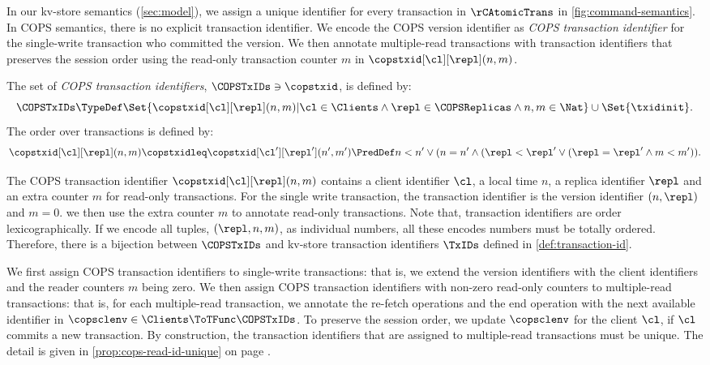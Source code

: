 In our kv-store semantics (\cref{sec:model}), 
we assign a unique identifier for every transaction in \(\rCAtomicTrans\) in \cref{fig:command-semantics}.
In COPS semantics, there is no explicit transaction identifier.
We encode the COPS version identifier as \emph{COPS transaction identifier}
for the single-write transaction who committed the version.
We then annotate multiple-read transactions with transaction identifiers that preserves the session order
using the read-only transaction counter \( m \) in \(\copstxid[\cl][\repl](n,m)  \).

\begin{definition}
The set of \emph{COPS transaction identifiers}, \( \COPSTxIDs \ni \copstxid \),
is defined by:
\[ 
    \COPSTxIDs \TypeDef \Set{\copstxid[\cl][\repl](n,m) | 
    \cl \in \Clients \land \repl \in \COPSReplicas \land n,m \in \Nat } \cup \Set{\txidinit}.
\]
The order over transactions is defined by:
\[ 
\copstxid[\cl][\repl](n,m) \copstxidleq \copstxid[\cl'][\repl'](n',m')
\PredDef n < n' \lor ( n = n' \land ( \repl < \repl' \lor ( \repl = \repl' \land m < m' ) ) .
\]
\end{definition}

The COPS transaction identifier \(\copstxid[\cl][\repl](n,m)  \) contains
a client identifier \( \cl \), a local time \(n\),
a replica identifier \( \repl \)
and an extra counter \( m \) for read-only transactions.
For the single write transaction, the transaction identifier is the version identifier \( (n,\repl) \) and \( m = 0 \).
we then use the extra counter \( m \) to annotate read-only transactions.
Note that, transaction identifiers are order lexicographically.
If we encode all tuples, \( (\repl,n,m) \), as individual numbers, 
all these encodes numbers must be totally ordered.
Therefore, there is a bijection between \( \COPSTxIDs \) 
and kv-store transaction identifiers \( \TxIDs\) defined in \cref{def:transaction-id}.

We first assign COPS transaction identifiers to single-write transactions:
that is, we extend the version identifiers with the client identifiers and the reader counters \( m \) being zero.
We then assign COPS transaction identifiers with non-zero read-only counters to multiple-read transactions:
that is, for each multiple-read transaction, 
we annotate the re-fetch operations and the end operation 
with the next available identifier in \( \copsclenv \in \Clients \ToTFunc \COPSTxIDs  \).
To preserve the session order, we update \( \copsclenv \) for the client \( \cl \),
if \( \cl \) commits a new transaction.
By construction, the transaction identifiers that are assigned to multiple-read transactions must be unique.
The detail is given in \cref{prop:cops-read-id-unique} on page \pageref{sec:proof-multiple-read-trans-id-unique}.


